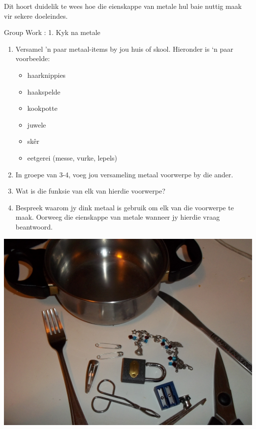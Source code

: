          \label{m38708*id65852}Dit hoort duidelik te wees hoe die eienskappe van metale hul baie nuttig maak vir sekere doeleindes.\par 
\label{m38708*secfhsst!!!underscore!!!id320} 
            \begin{activity}{Group Work : 1. Kyk na metale}{
            \nopagebreak
\begin{minipage}{0.5\textwidth}
        \label{m38708*id65869}\begin{enumerate}[noitemsep, label=\textbf{\arabic*}. ]
            \label{m38708*uid83}\item Versamel 'n paar metaal-items by jou huis of skool. Hieronder is ‘n paar voorbeelde:
\label{m38708*id65885}\begin{itemize}[noitemsep]
            \label{m38708*uid84}\item haarknippies
\label{m38708*uid85}\item haakspelde
\label{m38708*uid86}\item kookpotte
\label{m38708*uid87}\item juwele
\label{m38708*uid88}\item sk\^er
\label{m38708*uid89}\item eetgerei (messe, vurke, lepels)
\end{itemize}
        \label{m38708*uid90}\item In groepe van 3-4, voeg jou versameling metaal voorwerpe by die ander.
\label{m38708*uid91}\item Wat is die funksie van elk van hierdie voorwerpe?
\label{m38708*uid92}\item Bespreek waarom jy dink metaal is gebruik om elk van die voorwerpe te maak. Oorweeg die eienskappe van metale wanneer jy hierdie vraag beantwoord. 
\end{enumerate}
\end{minipage}
\begin{minipage}{.5\textwidth}
\begin{center}
 \includegraphics[width=.8\textwidth]{photos/metal_objects.jpg}\par
\end{center}
\end{minipage}
}
\end{activity}
      \label{m38708*uid93}
